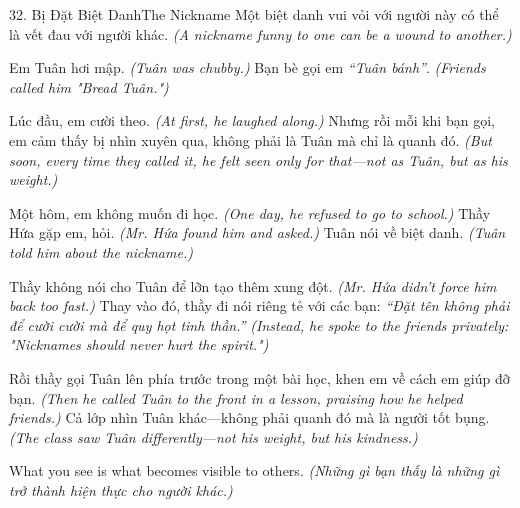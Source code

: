 \begin{truyen}{32. Bị Đặt Biệt Danh}{The Nickname}
Một biệt danh vui vỏi với người này có thể là vết đau với người khác.
\textit{(A nickname funny to one can be a wound to another.)}

Em Tuân hơi mập.
\textit{(Tuân was chubby.)}
Bạn bè gọi em \textit{``Tuân bánh''}.
\textit{(Friends called him "Bread Tuân.")}

Lúc đầu, em cười theo.
\textit{(At first, he laughed along.)}
Nhưng rồi mỗi khi bạn gọi, em cảm thấy bị nhìn xuyên qua, không phải là Tuân mà chỉ là quanh đó.
\textit{(But soon, every time they called it, he felt seen only for that—not as Tuân, but as his weight.)}

Một hôm, em không muốn đi học.
\textit{(One day, he refused to go to school.)}
Thầy Hứa gặp em, hỏi.
\textit{(Mr. Hứa found him and asked.)}
Tuân nói về biệt danh.
\textit{(Tuân told him about the nickname.)}

Thầy không nói cho Tuân để lỡn tạo thêm xung đột.
\textit{(Mr. Hứa didn't force him back too fast.)}
Thay vào đó, thầy đi nói riêng tẻ với các bạn: \textit{``Đặt tên không phải để cười cười mà để quy họt tinh thần.''}
\textit{(Instead, he spoke to the friends privately: "Nicknames should never hurt the spirit.")}

Rồi thầy gọi Tuân lên phía trước trong một bài học, khen em về cách em giúp đỡ bạn.
\textit{(Then he called Tuân to the front in a lesson, praising how he helped friends.)}
Cả lớp nhìn Tuân khác—không phải quanh đó mà là người tốt bụng.
\textit{(The class saw Tuân differently—not his weight, but his kindness.)}
\end{truyen}

\begin{baihoc}
What you see is what becomes visible to others.
\textit{(Những gì bạn thấy là những gì trở thành hiện thực cho người khác.)}
\end{baihoc}

